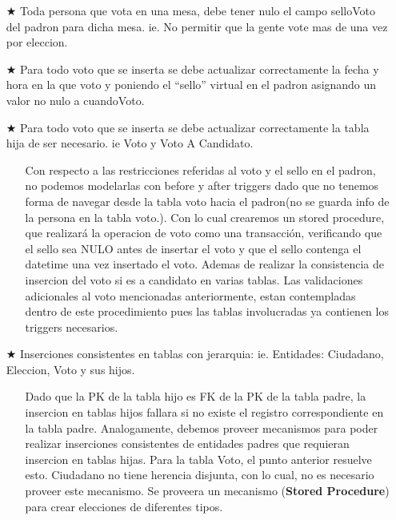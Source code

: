 \begin{itemize}
		\item[$\bigstar$] Toda persona que vota en una mesa, debe tener nulo el campo selloVoto del padron para dicha mesa. ie. No permitir que la gente vote mas de una vez por eleccion.
		\item[$\bigstar$] Para todo voto que se inserta se debe actualizar correctamente la fecha y hora en la que voto y poniendo el “sello” virtual en el padron asignando un valor no nulo a cuandoVoto.
		\item[$\bigstar$] Para todo voto que se inserta se debe actualizar correctamente la tabla hija de ser necesario. ie Voto y Voto A Candidato.
		\begin{itemize}
			\item[\Checkmark] Con respecto a las restricciones referidas al voto y el sello en el padron, no podemos modelarlas con before y after triggers dado que no tenemos forma de navegar desde la tabla voto hacia el padron(no se guarda info de la persona en la tabla voto.). Con lo cual crearemos un stored procedure, que realizará la operacion de voto como una transacción, verificando que el sello sea NULO antes de insertar el voto y que el sello contenga el datetime una vez insertado el voto. Ademas de realizar la consistencia de insercion del voto si es a candidato en varias tablas. Las validaciones adicionales al voto mencionadas anteriormente, estan contempladas dentro de este procedimiento pues las tablas involucradas ya contienen los triggers necesarios.
		\end{itemize}
\end{itemize}
\vspace{1.2cm}
\begin{itemize}
	\item[$\bigstar$] Inserciones consistentes en tablas con jerarquia: ie. Entidades: Ciudadano, Eleccion, Voto y sus hijos. 
	\begin{itemize}
		\item[\Checkmark] Dado que la PK de la tabla hijo es FK de la PK de la tabla padre, la insercion en tablas hijos fallara si no existe el registro correspondiente en la tabla padre. Analogamente, debemos proveer mecanismos para poder realizar inserciones consistentes de entidades padres que requieran insercion en tablas hijas. Para la tabla Voto, el punto anterior resuelve esto. Ciudadano no tiene herencia disjunta, con lo cual, no es necesario proveer este mecanismo. Se proveera un mecanismo (\textbf{Stored Procedure}) para crear elecciones de diferentes tipos. 
	\end{itemize}
\end{itemize}


